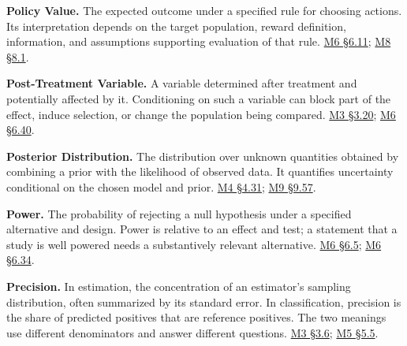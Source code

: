 \noindent\textbf{Policy Value.} The expected outcome under a specified rule for
choosing actions. Its interpretation depends on the target population,
reward definition, information, and assumptions supporting evaluation of
that rule.
\href{Marketing_Analytics_Lecture_Notes.pdf\#M06-ai-assisted-workflow-and-practice}{M6
§6.11};
\href{Marketing_Analytics_Lecture_Notes.pdf\#M08-recommendation-systems-learn-from-selected-exposure}{M8
§8.1}.

\noindent\textbf{Post-Treatment Variable.} A variable determined after treatment
and potentially affected by it. Conditioning on such a variable can
block part of the effect, induce selection, or change the population
being compared.
\href{Marketing_Analytics_Lecture_Notes.pdf\#M03-a-control-variable-needs-a-causal-role}{M3
§3.20};
\href{Marketing_Analytics_Lecture_Notes.pdf\#M06-treatment-affected-covariates-in-a-panel}{M6
§6.40}.

\noindent\textbf{Posterior Distribution.} The distribution over unknown
quantities obtained by combining a prior with the likelihood of observed
data. It quantifies uncertainty conditional on the chosen model and
prior.
\href{Marketing_Analytics_Lecture_Notes.pdf\#M04-released-retail-data-integrated-heterogeneity-and-competing-explanations}{M4
§4.31};
\hyperref[M09-heterogeneity-and-the-interpretation-of-consumer-harm]{M9
§9.57}.

\noindent\textbf{Power.} The probability of rejecting a null hypothesis under a
specified alternative and design. Power is relative to an effect and
test; a statement that a study is well powered needs a substantively
relevant alternative.
\href{Marketing_Analytics_Lecture_Notes.pdf\#M06-power-precision-and-the-minimum-useful-effect}{M6
§6.5};
\href{Marketing_Analytics_Lecture_Notes.pdf\#M06-inverse-power-and-the-scope-of-nonrejection}{M6
§6.34}.

\noindent\textbf{Precision.} In estimation, the concentration of an estimator's
sampling distribution, often summarized by its standard error. In
classification, precision is the share of predicted positives that are
reference positives. The two meanings use different denominators and
answer different questions.
\href{Marketing_Analytics_Lecture_Notes.pdf\#M03-uncertainty-dependence-and-practical-importance}{M3
§3.6};
\href{Marketing_Analytics_Lecture_Notes.pdf\#M05-case-study-a-complaint-detector-under-changing-prevalence}{M5
§5.5}.

